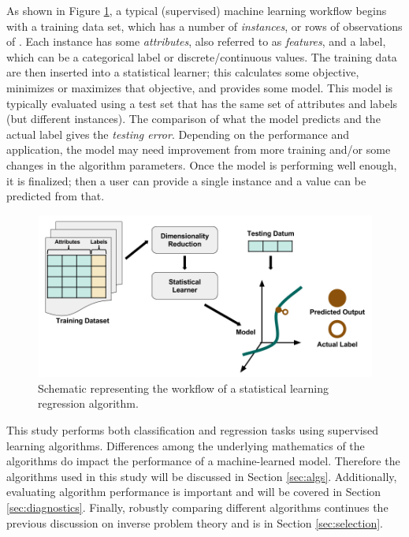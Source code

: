 As shown in Figure \ref{fig:supervised}, a typical (supervised) machine
learning workflow begins with a training data set, which has a number of
\textit{instances}, or rows of observations of .  Each instance has some \textit{attributes}, also referred to as \textit{features}, and a label, which
can be a categorical label or discrete/continuous values.  The training data
are then inserted into a statistical learner; this calculates some objective,
minimizes or maximizes that objective, and provides some model. This model is
typically evaluated using a test set that has the same set of attributes and
labels (but different instances). The comparison of what the model predicts and
the actual label gives the \textit{testing error}. Depending on the performance
and application, the model may need improvement from more training and/or some
changes in the algorithm parameters. Once the model is performing well enough,
it is finalized; then a user can provide a single instance and a value can be
predicted from that. 

\begin{figure}[h!]
  \includegraphics[width=\linewidth]{./chapters/intro/SupervisedRegression.png}
  \caption{Schematic representing the workflow of a statistical learning regression algorithm.}
  \label{fig:supervised}
\end{figure}

This study performs both classification and regression tasks using supervised
learning algorithms.  Differences among the underlying mathematics  of the algorithms do impact the performance of a machine-learned model.
Therefore the algorithms used in this study will be discussed in
Section \ref{sec:algs}. Additionally, evaluating algorithm performance is 
important and will be covered in Section \ref{sec:diagnostics}. Finally, 
robustly comparing different algorithms continues the previous discussion on 
inverse problem theory and is in Section \ref{sec:selection}.

